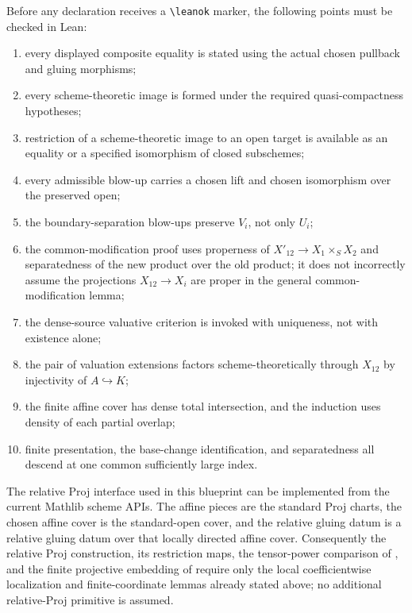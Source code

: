 Before any declaration receives a \verb|\leanok| marker, the following points
must be checked in Lean:
\begin{enumerate}
  \item every displayed composite equality is stated using the actual chosen
    pullback and gluing morphisms;
  \item every scheme-theoretic image is formed under the required
    quasi-compactness hypotheses;
  \item restriction of a scheme-theoretic image to an open target is available
    as an equality or a specified isomorphism of closed subschemes;
  \item every admissible blow-up carries a chosen lift and chosen isomorphism
    over the preserved open;
  \item the boundary-separation blow-ups preserve $V_i$, not only $U_i$;
  \item the common-modification proof uses properness of
    $X'_{12}\to X_1\times_SX_2$ and separatedness of the new product over the
    old product; it does not incorrectly assume the projections
    $X_{12}\to X_i$ are proper in the general common-modification lemma;
  \item the dense-source valuative criterion is invoked with uniqueness, not
    with existence alone;
  \item the pair of valuation extensions factors scheme-theoretically through
    $X_{12}$ by injectivity of $A\hookrightarrow K$;
  \item the finite affine cover has dense total intersection, and the induction
    uses density of each partial overlap;
  \item finite presentation, the base-change identification, and separatedness
    all descend at one common sufficiently large index.
\end{enumerate}

\begin{lemma}
  \label{lemma:nagata-relative-proj-current-api}

  The relative Proj interface used in this blueprint can be implemented from
  the current Mathlib scheme APIs.  The affine pieces are the standard Proj
  charts, the chosen affine cover is the standard-open cover, and the relative
  gluing datum is a relative gluing datum over that locally directed affine
  cover.  Consequently the relative Proj construction, its restriction maps,
  the tensor-power comparison of
  , and the finite
  projective embedding of
   require only the local
  coefficientwise localization and finite-coordinate lemmas already stated
  above; no additional relative-Proj primitive is assumed.
\end{lemma}

